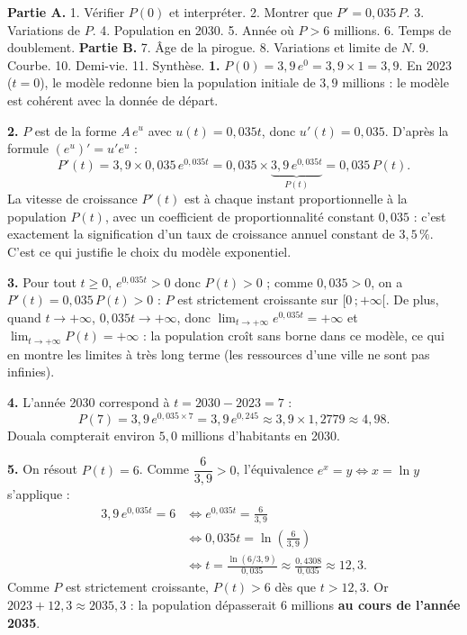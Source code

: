 \documentclass[11pt]{article}
\newcommand{\cle}[1]{{\popxbold\color{popdark}#1}}
\begin{document}
\begin{exoresolu}
\textbf{Partie A.} 1. Vérifier $P(0)$ et interpréter. 2. Montrer que $P' = 0,035\,P$. 3. Variations de $P$. 4. Population en 2030. 5. Année où $P > 6$ millions. 6. Temps de doublement. \textbf{Partie B.} 7. Âge de la pirogue. 8. Variations et limite de $N$. 9. Courbe. 10. Demi-vie. 11. Synthèse.
\tcblower
\textbf{1.} $P(0) = 3,9\,e^{0} = 3,9 \times 1 = 3,9$. En 2023 ($t = 0$), le modèle redonne bien la population initiale de $3,9$ millions : le modèle est cohérent avec la donnée de départ.

\textbf{2.} $P$ est de la forme $A\,e^{u}$ avec $u(t) = 0,035t$, donc $u'(t) = 0,035$. D'après la formule $(e^u)' = u'e^u$ :
\[ P'(t) = 3,9 \times 0,035\,e^{0,035t} = 0,035 \times \underbrace{3,9\,e^{0,035t}}_{P(t)} = 0,035\,P(t). \]
La vitesse de croissance $P'(t)$ est à chaque instant proportionnelle à la population $P(t)$, avec un coefficient de proportionnalité constant $0,035$ : c'est exactement la signification d'un taux de croissance annuel constant de $3,5\,\%$. C'est ce qui justifie le choix du modèle exponentiel.

\textbf{3.} Pour tout $t \geq 0$, $e^{0,035t} > 0$ donc $P(t) > 0$ ; comme $0,035 > 0$, on a $P'(t) = 0,035\,P(t) > 0$ : $P$ est \cle{strictement croissante} sur $[0\,;+\infty[$. De plus, quand $t \to +\infty$, $0,035t \to +\infty$, donc $\lim_{t \to +\infty} e^{0,035t} = +\infty$ et $\lim_{t \to +\infty} P(t) = +\infty$ : la population croît sans borne dans ce modèle, ce qui en montre les limites à très long terme (les ressources d'une ville ne sont pas infinies).

\textbf{4.} L'année 2030 correspond à $t = 2030 - 2023 = 7$ :
\[ P(7) = 3,9\,e^{0,035 \times 7} = 3,9\,e^{0,245} \approx 3,9 \times 1,2779 \approx 4,98. \]
Douala compterait environ $5,0$ millions d'habitants en 2030.

\textbf{5.} On résout $P(t) = 6$. Comme $\dfrac{6}{3,9} > 0$, l'équivalence $e^x = y \iff x = \ln y$ s'applique :
\begin{align*}
3,9\,e^{0,035t} = 6 &\iff e^{0,035t} = \frac{6}{3,9} \\
&\iff 0,035t = \ln\left(\frac{6}{3,9}\right) \\
&\iff t = \frac{\ln(6/3,9)}{0,035} \approx \frac{0,4308}{0,035} \approx 12,3.
\end{align*}
Comme $P$ est strictement croissante, $P(t) > 6$ dès que $t > 12,3$. Or $2023 + 12,3 \approx 2035,3$ : la population dépasserait $6$ millions \textbf{au cours de l'année 2035}.


\end{exoresolu}
\end{document}

